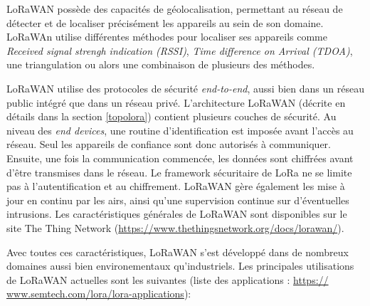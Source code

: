 \vspace{0.1cm}

LoRaWAN possède des capacités de géolocalisation, permettant au réseau de détecter et de localiser précisément les appareils au sein de son domaine. LoRaWAn utilise différentes méthodes pour localiser ses appareils comme \textit{Received signal strengh indication (RSSI)}, \textit{Time difference on Arrival (TDOA)}, une triangulation ou alors une combinaison de plusieurs des méthodes.

\vspace{0.1cm}

LoRaWAN utilise des protocoles de sécurité \textit{end-to-end}, aussi bien dans un réseau public intégré que dans un réseau privé. L'architecture LoRaWAN (décrite en détails dans la section \ref{topolora}) contient plusieurs couches de sécurité. Au niveau des \textit{end devices}, une routine d'identification est imposée avant l'accès au réseau. Seul les appareils de confiance sont donc autorisés à communiquer. Ensuite, une fois la communication commencée, les données sont chiffrées avant d'être transmises dans le réseau. Le framework sécuritaire de LoRa ne se limite pas à l'autentification et au chiffrement. LoRaWAN gère également les mise à jour en continu par les airs, ainsi qu'une supervision continue sur d'éventuelles intrusions. Les caractéristiques générales de LoRaWAN sont disponibles sur le site The Thing Network (\href{https://www.thethingsnetwork.org/docs/lorawan/}{https://www.thethingsnetwork.org/docs/lorawan/}).

\vspace{0.1cm}

Avec toutes ces caractéristiques, LoRaWAN s'est développé dans de nombreux domaines aussi bien environementaux qu'industriels. Les principales utilisations de LoRaWAN actuelles sont les suivantes (liste des applications : \href{https://www.semtech.com/lora/lora-applications}{https:// \\ www.semtech.com/lora/lora-applications}):

\vspace{0.1cm}


